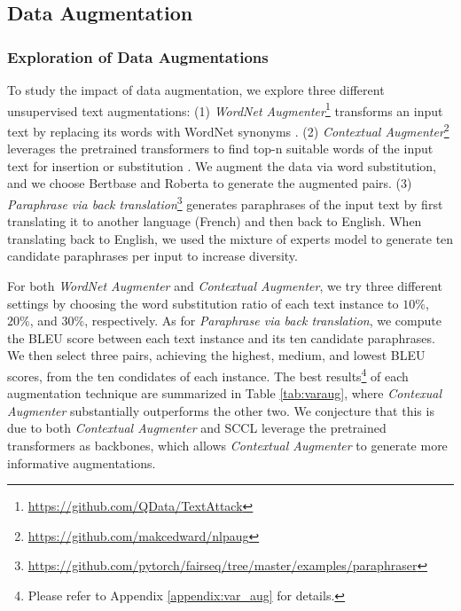 \documentclass[11pt]{article}
\begin{document}
\subsection{Data Augmentation}
\label{subsec:data_aug}
\subsubsection{Exploration of Data Augmentations}
\label{subsec:var_aug}
To study the impact of data augmentation, we explore three different unsupervised text augmentations: (1) \textit{WordNet Augmenter}\footnote{\url{https://github.com/QData/TextAttack}} transforms an input text by replacing its words with WordNet synonyms
\citep{morris2020textattack,ren2019generating}. (2) \textit{Contextual Augmenter}\footnote{\url{https://github.com/makcedward/nlpaug}} leverages the pretrained transformers to find top-n suitable words of the input text for insertion or substitution  \citep{kobayashi2018contextual,ma2019nlpaug}. We augment the data via word substitution, and we choose Bertbase and Roberta to generate the augmented pairs.
(3) \textit{Paraphrase via back translation}\footnote{ \url{https://github.com/pytorch/fairseq/tree/master/examples/paraphraser}} generates paraphrases of the input text by first translating it to another language (French) and then back to English. When translating back to English, we used the mixture of experts model \cite{shen2019mixture} to generate ten candidate paraphrases per input to increase diversity. 

For both \textit{WordNet Augmenter} and \textit{Contextual Augmenter}, we try three different settings by choosing the word substitution ratio of each text instance to $10\%$, $20\%$, and $30\%$, respectively. As for \textit{Paraphrase via back translation}, we compute the BLEU score between each text instance and its ten candidate paraphrases. We then select three pairs, achieving the highest, medium, and lowest BLEU scores, from the ten condidates of each instance. The best results\footnote{Please refer to Appendix \ref{appendix:var_aug} for details.} of each augmentation technique are summarized in Table \ref{tab:varaug}, where \textit{Contexual Augmenter} substantially outperforms the other two. We conjecture that this is due to both \textit{Contextual Augmenter} and SCCL leverage the pretrained transformers as backbones, which allows \textit{Contextual Augmenter} to generate more informative augmentations.
\end{document}
